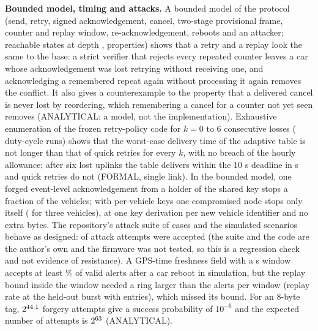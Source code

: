 \documentclass{ieeeaccess}
\begin{document}
\textbf{Bounded model, timing and attacks.} A bounded model of the protocol (send, retry, signed acknowledgement, cancel, two-stage provisional frame, counter and replay window, re-acknowledgement, reboots and an attacker; \BmcStates{} reachable states at depth \BmcDepth{}, \BmcProps{} properties) shows that a retry and a replay look the same to the base: a strict verifier that rejects every repeated counter leaves a car whose acknowledgement was lost retrying without receiving one, and acknowledging a remembered repeat again without processing it again removes the conflict. It also gives a counterexample to the property that a delivered cancel is never lost by reordering, which remembering a cancel for a counter not yet seen removes (ANALYTICAL: a model, not the implementation). Exhaustive enumeration of the frozen retry-policy code for $k=0$ to 6 consecutive losses (\TimedRuns{} duty-cycle runs) shows that the worst-case delivery time of the adaptive table is not longer than that of quick retries for every $k$, with no breach of the hourly allowance; after six lost uplinks the table delivers within the 10 s deadline in \TimedDOneSix{} s and quick retries do not (FORMAL, single link). In the bounded model, one forged event-level acknowledgement from a holder of the shared key stops a fraction \RFourShared{} of the vehicles; with per-vehicle keys one compromised node stops only itself (\RFourPer{} for three vehicles), at one key derivation per new vehicle identifier and no extra bytes. The repository's attack suite of \SuiteTotal{} cases and the simulated scenarios behave as designed: \SuiteAccepted{} of \SuiteAttempts{} attack attempts were accepted (the suite and the code are the author's own and the firmware was not tested, so this is a regression check and not evidence of resistance). A GPS-time freshness field with a \ROneWindow{} s window accepts at least \ROneAvail\% of valid alerts after a car reboot in simulation, but the replay bound inside the window needed a ring larger than the alerts per window (replay rate \ROneRate{} at the held-out burst with \ROneRing{} entries), which missed its bound. For an 8-byte tag, $2^{44.1}$ forgery attempts give a success probability of $10^{-6}$ and the expected number of attempts is $2^{63}$ (ANALYTICAL).
\end{document}
